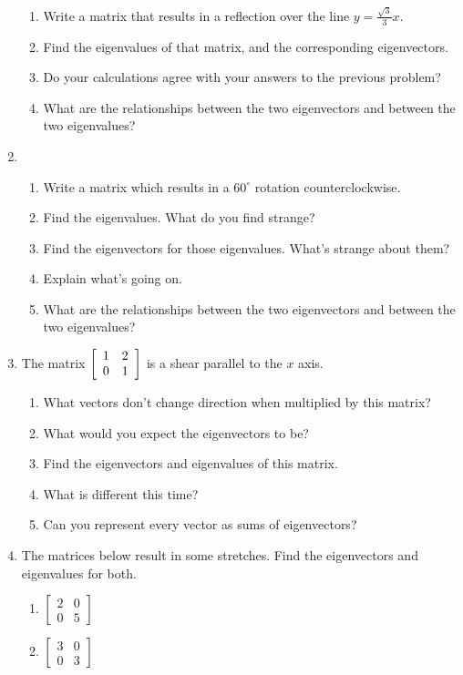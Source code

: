 \documentclass[../gatm.tex]{subfiles}
\begin{document}
\begin{enumerate}
\begin{enumerate}
\item Write a matrix that results in a reflection over the line $y=\frac{\sqrt{3}}{3}x.$
\item Find the eigenvalues of that matrix, and the corresponding eigenvectors.
\item Do your calculations agree with your answers to the previous problem?
\item What are the relationships between the two eigenvectors and between the two eigenvalues?
\end{enumerate}
\item \begin{enumerate}
\item Write a matrix which results in a $60^\circ$ rotation counterclockwise.
\item Find the eigenvalues. What do you find strange?
\item Find the eigenvectors for those eigenvalues. What's strange about them?
\item Explain what's going on.
\item What are the relationships between the two eigenvectors and between the two eigenvalues?
\end{enumerate}
\item The matrix $\left[\begin{array}{cc} 1 & 2 \\ 0 & 1 \end{array}\right]$ is a shear parallel to the $x$ axis.
\begin{enumerate}
\item What vectors don't change direction when multiplied by this matrix?
\item What would you expect the eigenvectors to be?
\item Find the eigenvectors and eigenvalues of this matrix.
\item What is different this time?
\item Can you represent every vector as sums of eigenvectors?
\end{enumerate}
\item The matrices below result in some stretches. Find the eigenvectors and eigenvalues for both.
\begin{multicols}{2}
\begin{enumerate}
\item $\left[\begin{smallmatrix} 2 & 0 \\ 0 & 5 \end{smallmatrix}\right]$
\item $\left[\begin{smallmatrix} 3 & 0 \\ 0 & 3 \end{smallmatrix}\right]$

\end{enumerate}
\end{multicols}
\end{enumerate}
\end{document}
